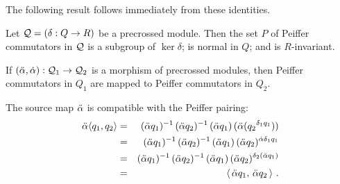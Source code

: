 \bigskip 
The following result follows immediately from these identities.

\begin{cor}
Let  $\mathcal{Q} = (\delta : Q \to R)$  be a precrossed module.
Then the set  $P$  of Peiffer commutators in $\mathcal{Q}$
is a subgroup of  $\ker \delta$;
is normal in  $Q$;  and is  $R$-invariant.
\end{cor}

\begin{prop}
If  $(\ddot{\alpha},\dot{\alpha}) : \mathcal{Q}_1 \to \mathcal{Q}_2$  is a morphism of precrossed modules,
then Peiffer commutators in $Q_1$  are mapped to Peiffer commutators
in $Q_2$.
\end{prop}
\begin{pf}
The source map  $\ddot{\alpha}$  is compatible with the Peiffer pairing:
\begin{eqnarray*}
\ddot{\alpha} \langle q_1, q_2 \rangle & = &
(\ddot{\alpha} q_1)^{-1}\,(\ddot{\alpha} q_2)^{-1}\,(\ddot{\alpha} q_1)\,(\ddot{\alpha}({q_2}^{\delta_1q_1})) \\
 & = &
(\ddot{\alpha} q_1)^{-1}\,(\ddot{\alpha} q_2)^{-1}\,(\ddot{\alpha} q_1)\,(\ddot{\alpha} q_2)^{\dot{\alpha}\delta_1q_1} \\
 & = &
(\ddot{\alpha} q_1)^{-1}\,(\ddot{\alpha} q_2)^{-1}\,(\ddot{\alpha} q_1)\,(\ddot{\alpha} q_2)^{\delta_2(\ddot{\alpha} q_1)}\\
 & = &
\langle\,\ddot{\alpha} q_1,\,\ddot{\alpha} q_2\,\rangle~.
\end{eqnarray*}
\end{pf}

